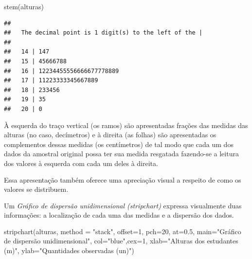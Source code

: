 \documentclass[
]{book}
\newenvironment{Shaded}{\begin{snugshade}}{\end{snugshade}}
\newcommand{\AttributeTok}[1]{\textcolor[rgb]{0.77,0.63,0.00}{#1}}
\newcommand{\DecValTok}[1]{\textcolor[rgb]{0.00,0.00,0.81}{#1}}
\newcommand{\FloatTok}[1]{\textcolor[rgb]{0.00,0.00,0.81}{#1}}
\newcommand{\FunctionTok}[1]{\textcolor[rgb]{0.00,0.00,0.00}{#1}}
\newcommand{\NormalTok}[1]{#1}
\newcommand{\StringTok}[1]{\textcolor[rgb]{0.31,0.60,0.02}{#1}}
\begin{document}
\begin{Shaded}
\begin{Highlighting}[]
\FunctionTok{stem}\NormalTok{(alturas)}
\end{Highlighting}
\end{Shaded}

\begin{verbatim}
## 
##   The decimal point is 1 digit(s) to the left of the |
## 
##   14 | 147
##   15 | 45666788
##   16 | 12234455556666677778889
##   17 | 11223333345667889
##   18 | 233456
##   19 | 35
##   20 | 0
\end{verbatim}

À esquerda do traço vertical (os ramos) são apresentadas frações das medidas das alturas (no caso, decímetros) e à direita (as folhas) são apresentadas os complementos dessas medidas (os centímetros) de tal modo que cada um dos dados da amostral original possa ter sua medida resgatada fazendo-se a leitura dos valores à esquerda com cada um deles à direita.

Essa apresentação também oferece uma apreciação visual a respeito de como os valores se distribuem.

Um \emph{Gráfico de dispersão unidimensional (stripchart)} expressa visualmente duas informações: a localização de cada uma das medidas e a dispersão dos dados.

\begin{Shaded}
\begin{Highlighting}[]
\FunctionTok{stripchart}\NormalTok{(alturas, }\AttributeTok{method =} \StringTok{"stack"}\NormalTok{, }\AttributeTok{offset=}\DecValTok{1}\NormalTok{,}
           \AttributeTok{pch=}\DecValTok{20}\NormalTok{, }\AttributeTok{at=}\FloatTok{0.5}\NormalTok{,}
           \AttributeTok{main=}\StringTok{"Gráfico de dispersão unidimensional"}\NormalTok{,}
           \AttributeTok{col=}\StringTok{"blue"}\NormalTok{,}\AttributeTok{cex=}\DecValTok{1}\NormalTok{,}
           \AttributeTok{xlab=}\StringTok{"Alturas dos estudantes (m)"}\NormalTok{,}
           \AttributeTok{ylab=}\StringTok{"Quantidades observadas (un)"}\NormalTok{)}
\end{Highlighting}
\end{Shaded}
\end{document}
